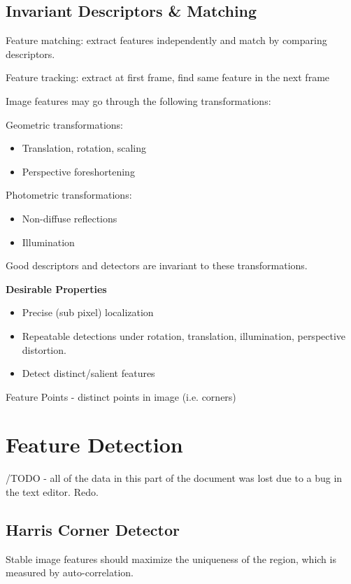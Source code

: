 \begin{enumerate}
\subsection{ Invariant Descriptors \& Matching}

Feature matching: extract features independently and match by comparing descriptors.

Feature tracking: extract at first frame, find same feature in the next frame

Image features may go through the following transformations:

Geometric transformations:
\begin{itemize}
\item Translation, rotation, scaling
\item Perspective foreshortening 
\end{itemize}

Photometric transformations:
\begin{itemize}
\item Non-diffuse reflections 
\item Illumination
\end{itemize}

Good descriptors and detectors are invariant to these transformations. 

\textbf{Desirable Properties}
\begin{itemize} 
\item Precise (sub pixel) localization
\item Repeatable detections under rotation, translation, illumination, perspective distortion.
\item Detect distinct/salient features
\end{itemize}

Feature Points - distinct points in image (i.e. corners)

\section{Feature Detection}

/TODO - all of the data in this part of the document was lost due to a bug in the text editor. Redo.

\subsection{Harris Corner Detector}

Stable image features should maximize the uniqueness of the region, which is measured by auto-correlation.


\end{enumerate}
